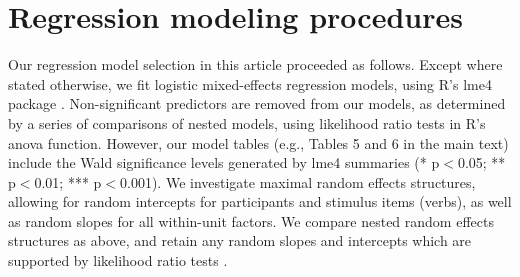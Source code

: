 \documentclass[12pt]{article}
\begin{document}
\section{Regression modeling procedures}\label{appendixregression}


Our regression model selection in this article proceeded as follows. Except where stated otherwise, we fit logistic mixed-effects regression models, using R's lme4 package \citep{bateslme4}. Non-significant predictors are removed from our models, as determined by a series of comparisons of nested models, using likelihood ratio tests in R's anova function. However, our model tables (e.g., Tables 5 and 6 in the main text) include the Wald significance levels generated by lme4 summaries (* p$<$0.05; ** p$<$0.01; *** p$<$0.001).  
We investigate maximal random effects structures, allowing for random intercepts for participants and stimulus items (verbs), as well as random slopes for all within-unit factors. We compare nested random effects structures as above, and retain any random slopes and intercepts which are supported by likelihood ratio tests \citep{baayen2008mixed}.
\end{document}
